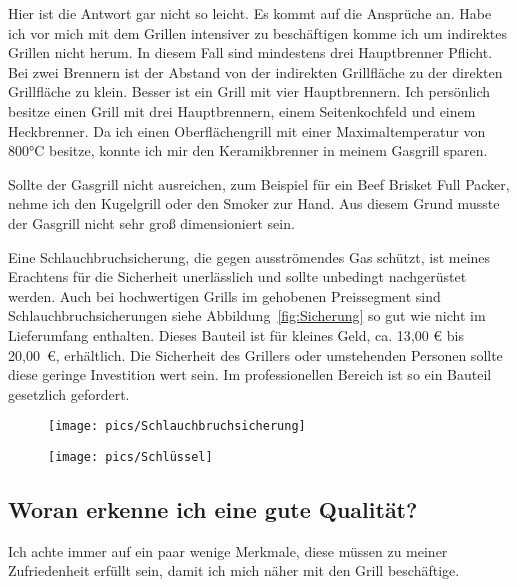 	Hier ist die 
	Antwort gar nicht so leicht. 
	Es kommt auf die Ansprüche an. Habe ich 
	vor mich mit dem Grillen intensiver zu beschäftigen komme ich um indirektes 
	Grillen nicht herum. In diesem Fall sind 
	mindestens drei Hauptbrenner 
	Pflicht.  Bei zwei Brennern ist der Abstand von der indirekten Grillfläche zu der 
	direkten Grillfläche zu klein. Besser ist ein Grill 
	mit vier 
	Hauptbrennern. Ich persönlich besitze einen Grill mit drei Hauptbrennern, 
	einem Seitenkochfeld und einem Heckbrenner. Da 
	ich einen 
	Oberflächengrill mit einer Maximaltemperatur von 800°C besitze, konnte ich 
	mir den Keramikbrenner in meinem Gasgrill 
	sparen. 
	
	Sollte der Gasgrill nicht ausreichen, zum Beispiel für ein Beef Brisket Full 
	Packer, nehme ich den Kugelgrill oder den Smoker 
	zur Hand. Aus diesem 
	Grund musste der Gasgrill nicht sehr groß dimensioniert sein. 
	
	Eine Schlauchbruchsicherung, die gegen ausströmendes Gas schützt, ist 
	meines Erachtens für die Sicherheit unerlässlich 
	und sollte unbedingt nachgerüstet 
	werden. 
	Auch bei hochwertigen Grills im gehobenen Preissegment sind 
	Schlauchbruchsicherungen siehe 
	Abbildung~\vref{fig:Sicherung} so gut wie nicht im 
	Lieferumfang enthalten. Dieses Bauteil ist für kleines Geld, ca. 13,00 € bis 
	20,00~€, erhältlich. Die Sicherheit des Grillers 
	oder umstehenden 
	Personen sollte diese geringe Investition wert sein. Im 
	professionellen Bereich ist so ein Bauteil gesetzlich gefordert.

\begin{figure}[htbp]
	\centering
	\begin{minipage}{.5\textwidth}
		\centering
		\texttt{[image: pics/Schlauchbruchsicherung]}
		\label{fig:Sicherung}
	\end{minipage}%
	\begin{minipage}{.5\textwidth}
		\centering
		\texttt{[image: pics/Schlüssel]}
		\label{fig:Schlüssel}
	\end{minipage}%
\end{figure}

\subsection{Woran erkenne ich eine gute Qualität?}

	Ich achte immer auf ein paar wenige Merkmale, diese müssen zu meiner 
	Zufriedenheit erfüllt sein, damit ich mich näher mit den Grill beschäftige. 

